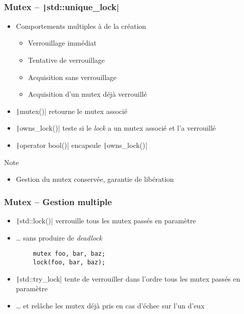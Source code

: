 \documentclass[C++.tex]{subfiles}
\begin{document}
\begin{frame}[fragile]
	\frametitle{Mutex -- \texttt|std::unique_lock|}
	\begin{itemize}
		\item Comportements multiples à de la création
		\begin{itemize}
			\item Verrouillage immédiat
			\item Tentative de verrouillage
			\item Acquisition sans verrouillage
			\item Acquisition d'un mutex déjà verrouillé
		\end{itemize}
		\item \texttt|mutex()| retourne le mutex associé
		\item \texttt|owns_lock()| teste si le \textit{lock} a un mutex associé et l'a verrouillé
		\item \texttt|operator bool()| encapsule \texttt|owns_lock()|
	\end{itemize}

	\begin{block}{Note}
		\begin{itemize}
			\item Gestion du mutex conservée, garantie de libération
		\end{itemize}
	\end{block}
\end{frame}

\begin{frame}[fragile]
	\frametitle{Mutex -- Gestion multiple}
	\begin{itemize}
		\item \texttt|std::lock()| verrouille tous les mutex passés en paramètre
		\item \ldots{} sans produire de \textit{deadlock}
	\end{itemize}

	\begin{verbatim}
		mutex foo, bar, baz;
		lock(foo, bar, baz);
	\end{verbatim}

	\begin{itemize}
		\item \texttt|std::try_lock| tente de verrouiller dans l'ordre tous les mutex passés en paramètre
		\item \ldots{} et relâche les mutex déjà pris en cas d'échec sur l'un d'eux
	\end{itemize}
\end{frame}
\end{document}
